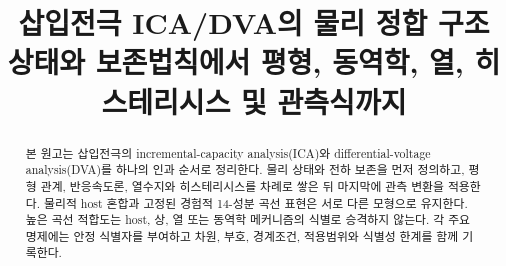 \documentclass[11pt,a4paper]{article}
\title{\textbf{삽입전극 ICA/DVA의 물리 정합 구조}\\[0.35em]
\large 상태와 보존법칙에서 평형, 동역학, 열, 히스테리시스 및 관측식까지}
\author{}
\date{}
\theoremstyle{anodeblock}
\begin{document}
\maketitle

\begin{abstract}
본 원고는 삽입전극의 incremental-capacity analysis(ICA)와
differential-voltage analysis(DVA)를 하나의 인과 순서로 정리한다.
물리 상태와 전하 보존을 먼저 정의하고, 평형 관계, 반응속도론,
열수지와 히스테리시스를 차례로 쌓은 뒤 마지막에 관측 변환을 적용한다.
물리적 host 혼합과 고정된 경험적 14-성분 곡선 표현은 서로 다른
모형으로 유지한다. 높은 곡선 적합도는 host, 상, 열 또는 동역학
메커니즘의 식별로 승격하지 않는다. 각 주요 명제에는 안정 식별자를
부여하고 차원, 부호, 경계조건, 적용범위와 식별성 한계를 함께 기록한다.
\end{abstract}

\tableofcontents
\newpage

















\appendix



\end{document}
